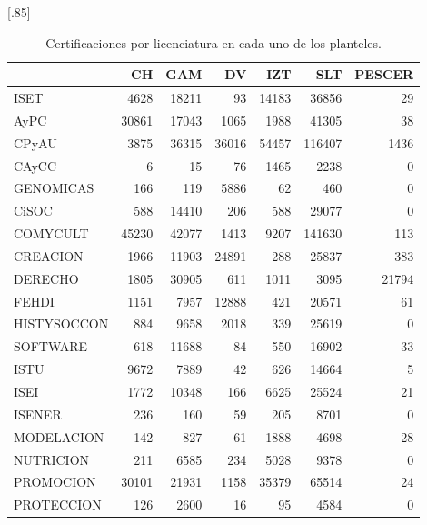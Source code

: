 \documentclass[12pt]{article}
\begin{document}
\begin{table}[ht]
\centering
\scalebox{0.75}[.85]{
\begin{tabular}{lrrrrrr}
  \hline
 & CH & GAM & DV & IZT & SLT & PESCER \\ 
  \hline\hline
ISET & 4628 & 18211 &  93 & 14183 & 36856 &  29 \\ 
  AyPC & 30861 & 17043 & 1065 & 1988 & 41305 &  38 \\ 
  CPyAU & 3875 & 36315 & 36016 & 54457 & 116407 & 1436 \\ 
  CAyCC &   6 &  15 &  76 & 1465 & 2238 &   0 \\ 
  GENOMICAS & 166 & 119 & 5886 &  62 & 460 &   0 \\ 
  CiSOC & 588 & 14410 & 206 & 588 & 29077 &   0 \\ 
  COMYCULT & 45230 & 42077 & 1413 & 9207 & 141630 & 113 \\ 
  CREACION & 1966 & 11903 & 24891 & 288 & 25837 & 383 \\ 
  DERECHO & 1805 & 30905 & 611 & 1011 & 3095 & 21794 \\ 
  FEHDI & 1151 & 7957 & 12888 & 421 & 20571 &  61 \\ 
  HISTYSOCCON & 884 & 9658 & 2018 & 339 & 25619 &   0 \\ 
  SOFTWARE & 618 & 11688 &  84 & 550 & 16902 &  33 \\ 
  ISTU & 9672 & 7889 &  42 & 626 & 14664 &   5 \\ 
  ISEI & 1772 & 10348 & 166 & 6625 & 25524 &  21 \\ 
  ISENER & 236 & 160 &  59 & 205 & 8701 &   0 \\ 
  MODELACION & 142 & 827 &  61 & 1888 & 4698 &  28 \\ 
  NUTRICION & 211 & 6585 & 234 & 5028 & 9378 &   0 \\ 
  PROMOCION & 30101 & 21931 & 1158 & 35379 & 65514 &  24 \\ 
  PROTECCION & 126 & 2600 &  16 &  95 & 4584 &   0 \\ 
   \hline
\end{tabular}
}
\caption{\label{Cert_Lic_Plantel}Certificaciones por licenciatura en cada uno de los planteles.}
\end{table}
\end{document}
